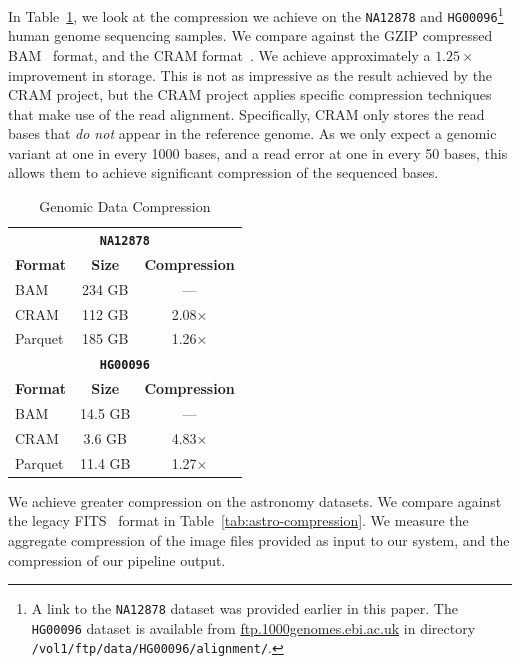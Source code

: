\documentclass{acm_proc_article-sp}
\begin{document}
In Table~\ref{tab:genomic-compression}, we look at the compression we achieve on the \texttt{NA12878}
and \texttt{HG00096}\footnote{A link to the \texttt{NA12878} dataset was provided earlier in this paper. The
\texttt{HG00096} dataset is available from \url{ftp.1000genomes.ebi.ac.uk} in directory 
\texttt{/vol1/ftp/data/HG00096/alignment/}.} human genome sequencing samples. We compare against the
GZIP compressed BAM~\cite{li09} format, and the CRAM format~\cite{fritz11}. We achieve approximately a
$1.25\times$ improvement in storage. This is not as impressive as the result achieved by the CRAM project,
but the CRAM project applies specific compression techniques that make use of the read alignment. Specifically,
CRAM only stores the read bases that \emph{do not} appear in the reference genome. As we only expect a
genomic variant at one in every 1000 bases, and a read error at one in every 50 bases, this allows them to
achieve significant compression of the sequenced bases.

\begin{table}[h]
\caption{Genomic Data Compression}
\label{tab:genomic-compression}
\begin{center}
\begin{tabular}{ l c c }
\hline
\multicolumn{3}{c}{\bf \texttt{NA12878}} \\
\bf Format & \bf Size & \bf Compression \\
\hline
\hline
BAM & 234 GB & --- \\
CRAM & 112 GB & 2.08$\times$ \\
Parquet & 185 GB & 1.26$\times$ \\
\hline
\multicolumn{3}{c}{\bf \texttt{HG00096}} \\
\bf Format & \bf Size & \bf Compression \\
\hline
\hline
BAM & 14.5 GB & --- \\
CRAM & 3.6 GB & 4.83$\times$ \\
Parquet & 11.4 GB & 1.27$\times$ \\
\hline
\end{tabular}
\end{center}
\end{table}

We achieve greater compression on the astronomy datasets. We compare against the legacy FITS~\cite{wells81}
format in Table~\ref{tab:astro-compression}. We measure the aggregate compression of the image files provided
as input to our system, and the compression of our pipeline output.
\end{document}
